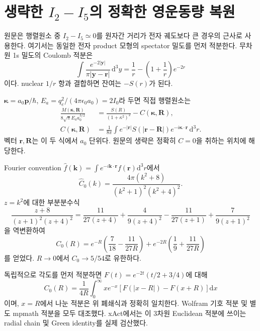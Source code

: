 \documentclass[11pt,a4paper]{article}
\newcommand{\dd}{\mathrm d}\newcommand{\kb}{k_{\rm B}}\newcommand{\ev}{\epsilon_{\rm eV}}\newcommand{\eV}{\mathrm{eV}}\newcommand{\cm}{\mathrm{CM}}\newcommand{\lab}{\mathrm{lab}}
\numberwithin{equation}{section}
\begin{document}
\newpage
\section{생략한 $I_2-I_5$의 정확한 영운동량 복원}
원문은 행렬원소 중 $I_2-I_5\simeq0$를 원자간 거리가 전자 궤도보다 큰 경우의 근사로 사용한다\cite{sheldon}. 여기서는 동일한 전자 product 모형의 spectator 밀도를 먼저 적분한다. 무차원 1s 밀도의 Coulomb 적분은
\begin{equation}
\int\frac{e^{-2|\bm y|}}{\pi|\bm y-\bm r|}\,\dd^3y
=\frac1r-\left(1+\frac1r\right)e^{-2r}
\end{equation}
이다. nuclear $1/r$ 항과 결합하면 잔여는 $-S(r)$가 된다.

$\bm\kappa=a_0\bm p/\hbar$, $E_a=q_e^2/(4\pi\epsilon_0a_0)=2I_0$라 두면 직접 행렬원소는
\begin{align}
\frac{M(\bm\kappa,\bm R)}{8\sqrt\pi E_a a_0^{3/2}}
&=\frac{S(R)}{(1+\kappa^2)^2}-C(\bm\kappa,\bm R),\\
C(\bm\kappa,\bm R)
&=\frac1{8\pi}\int e^{-|\bm r|}S(|\bm r-\bm R|)
 e^{-i\bm\kappa\cdot\bm r}\,\dd^3r .
\end{align}
벡터 $\bm r,\bm R$는 이 두 식에서 $a_0$ 단위다. 원문의 생략은 정확히 $C=0$을 취하는 위치에 해당한다.

Fourier convention $\widehat f(\bm k)=\int e^{-i\bm k\cdot\bm r}f(\bm r)\dd^3r$에서
\begin{equation}
\widehat C_0(k)=\frac{4\pi(k^2+8)}{(k^2+1)^2(k^2+4)^2}.
\end{equation}
$z=k^2$에 대한 부분분수식
\[
\frac{z+8}{(z+1)^2(z+4)^2}
=\frac{11}{27(z+4)}+\frac4{9(z+4)^2}
 -\frac{11}{27(z+1)}+\frac7{9(z+1)^2}
\]
을 역변환하여
\begin{equation}\boxed{
C_0(R)=e^{-R}\left(\frac7{18}-\frac{11}{27R}\right)
+e^{-2R}\left(\frac19+\frac{11}{27R}\right)
}\end{equation}
를 얻었다. $R\to0$에서 $C_0\to5/54$로 유한하다.

독립적으로 각도를 먼저 적분하면 $F(t)=e^{-2t}(t/2+3/4)$에 대해
\begin{equation}
C_0(R)=\frac1{4R}\int_0^\infty x e^{-x}
 [F(|x-R|)-F(x+R)]\dd x
\end{equation}
이며, $x=R$에서 나눈 적분은 위 폐쇄식과 정확히 일치한다. Wolfram 기호 적분 및 별도 mpmath 적분을 모두 대조했다. xAct에서는 이 3차원 Euclidean 적분에 쓰이는 radial chain 및 Green identity를 실제 검산했다.

\newpage
\end{document}
